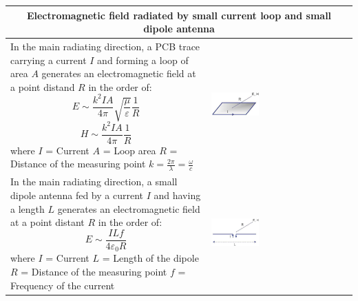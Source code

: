 		\begin{table}[h!]
		\centering
		\begin{tabular}{|m{}|m{}|}
				\multicolumn{2}{c}{\textbf{Electromagnetic field radiated by small current loop and small dipole antenna}}
			\\
			\hline
				In the main radiating direction, a PCB trace carrying a current $I$ and forming a loop of area $A$ generates an electromagnetic field at a point distand $R$ in the order of:\newline
				\begin{equation}
					E \sim \frac{k^2 I A}{4\pi} \sqrt{\frac{\mu}{\varepsilon}}\frac{1}{R}
				\end{equation}
				\begin{equation}
					H \sim \frac{k^2 I A}{4\pi}\frac{1}{R}
				\end{equation}
				where\newline
				$I$ = Current\newline
				$A$ = Loop area\newline
				$R$ = Distance of the measuring point \newline
				$k = \frac{2\pi}{\lambda} = \frac{\omega}{c}$ 
			& 
				 \begin{center}\includegraphics[width=0.35\textwidth]{images/CurrentLoop.png}\end{center}  
			\\
			\hline
				In the main radiating direction, a small dipole antenna fed by a current $I$ and having a length $L$ generates an electromagnetic field at a point distant $R$ in the order of: \newline
				\begin{equation}
					E \sim \frac{I L f}{4\varepsilon_0 R}
				\end{equation}
				where\newline
				$I$ = Current\newline
				$L$ = Length of the dipole\newline
				$R$ = Distance of the measuring point \newline
				$f$ = Frequency of the current				
			& 
				 \begin{center}\includegraphics[width=0.35\textwidth]{images/DipoleAntenna.png}\end{center}  
			\\
			\hline
			\end{tabular}
		\end{table}	
		
